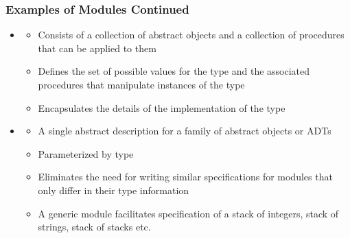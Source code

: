 \documentclass[t,12pt,numbers,fleqn]{beamer}
\begin{document}

\begin{frame}
\frametitle{Examples of Modules Continued}

\begin{itemize}

\item {}
\begin{itemize}
\item Consists of a collection of abstract objects and a collection of
  procedures that can be applied to them
\item Defines the set of possible values for the type and the associated
  procedures that manipulate instances of the type
\item Encapsulates the details of the implementation of the type
\end{itemize}
\item {}
\begin{itemize}
\item A single abstract description for a family of abstract objects or ADTs
\item Parameterized by type
\item Eliminates the need for writing similar specifications for modules that
  only differ in their type information
\item A generic module facilitates specification of a stack of integers, stack
  of strings, stack of stacks etc.
\end{itemize}

\end{itemize}

\end{frame}






\end{document}
